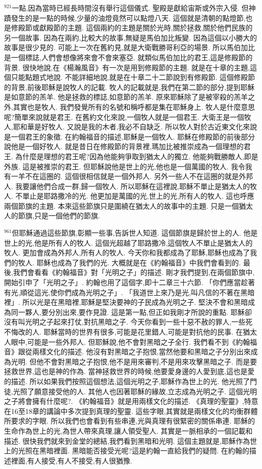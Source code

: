 \documentclass{book}
\begin{document}
$^{921}$一點,因為當時已經長時間沒有舉行這個儀式.
聖殿是獻給宙斯或外宗入侵.
但神蹟發生的是一點的時候,少量的油燈竟然可以點燈八天.
這個就是清朝的點燈節,也是修殿節或獻殿節的主題.
這個兩約的主題是關於光時,關於拯救,關於他們民族的另一個故事.
因為在兩約,比較大的故事,無疑是馬伯加比叛變.
因為這個以小勝大的故事是很少見的.
可能上一次在舊約見,就是大衛戰勝哥利亞的場景.
所以馬伯加比是一個標誌,人們會想像將來會不會來塞亞.
就類似馬伯加比的君王,這是修殿節的背景.
很快地說,在《楊瀚風音》有一次是用到修殿節的主題.
就是在十章的主題,這個只能點題式地說.
不能詳細地說,就是在十章二十二節說到有修殿節.
這個修殿節的背景,前後耶穌是說牧人的記載.
牧人的記載就是,我們在第二節的部分,提到耶穌是如意節的羔羊.
他是拯救的標誌,如意節的羔羊.
原來耶穌除了是被宰殺的羔羊之外,其實也是牧人.
我們發覺所有的名號和稱呼都是集在耶穌身上.
牧人是什麼意思呢?簡單來說就是君王.
在舊約文化來說,一個牧人就是一個君王.
大衛王是一個牧人,耶和華是好牧人.
又說是我的木者,我必不自缺乏.
所以牧人對於古近東文化來說是一個君王的象徵.
在約翰福音的描述,耶穌是一個牧人.
耶穌在修殿節的前後部分說他是一個好牧人.
就是昔日在修殿節的背景裡,瑪加比被推崇成為一個理想的君王.
為什麼是理想的君王呢?因為他能夠爭取到猶太人的獨立.
他能夠戰勝敵人,即是外族.
這是被推崇的君王.
但耶穌說他是世上的光,他也是一個萬國的牧人.
我令我有一羊不在這圈的.
這個很相信就是一個外邦人.
另外一些人不在這圈的就是外邦人.
我要讓他們合成一群,歸一個牧人.
所以耶穌在這裡說,耶穌不單止是猶太人的牧人.
不單止是耶路撒冷的光.
他更加是萬國的光,世上的光,所有人的牧人.
這也呼應兩個節旗的主題.
本來這些節旗只是圍繞在猶太人的故事中的主題.
只是一個猶太人的節旗,只是一個他們的節旗.

$^{961}$但耶穌通過這些節旗,彰顯一些事,告訴世人知道.
這個節旗是歸於世上的人.
他是世上的光,他是所有人的牧人.
這個光超越了耶路撒冷,這個牧人不單止是猶太人的牧人.
更加會成為外邦人,所有人的牧人.
今天你和我都成為了耶穌,耶穌也成為了我們的牧人.
耶穌也成為了我們的光.
大概就是在《約翰福音》中我們會看到的.
最後,我們會看看《約翰福音》對「光明之子」的描述.
剛才我們提到,在兩個節旗中,開始引申了「光明之子」.
約翰也用了這個字,即十二章三十六節.
「你們應當趁著有光,順從這光,使你們成為光明之子」.
「我道世上來乃是光,叫凡信的不著在黑暗裡」.
所以光是在黑暗裡,耶穌是堅決要神的子民成為光明之子.
堅決不會和黑暗成為同一夥人,要分別出來,要作見證.
這是第一點,但正如我剛才所說的重點.
耶穌卻沒有叫光明之子起來打仗,對抗黑暗之子.
今天你看到一些十惡不赦的罪人,一些死不悔改的人.
耶穌當時的世界有很多,可能是花里錯人,可能是對抗他的民事.
在猶太人眼中,可能是一些外邦人.
但耶穌說,他不會對黑暗之子全行.
我們看不到《約翰福音》跟從兩樣文化的描述.
他沒有對黑暗之子抱恨,當然他要和黑暗之子分別出來成為光明.
但他不會對黑暗之子抱恨,他不是用來審判,不是用來攻擊黑暗之子.
而是要拯救世界,這也是神的作為.
當神拯救世界的時候,他要愛身邊的人愛到底,這也是愛的描述.
所以如果我們按照這個想法,這個光明之子,耶穌作為世上的光.
他光照了門徒,光照了願意接受他的人.
其他人也因著耶穌的緣故,立志成為光明之子.
這個光明之子將會擁有什麼呢?.
《約翰福音》就是用兩樣文化的描述.
《真理的聖靈》,特意在16至18章的講論中多次提到真理的聖靈.
這些字眼,其實就是兩樣文化的均衡群體所要求的字眼.
所以我們也會看到有些串連,光與真理有很緊密的關係串連.
耶穌的生命作為世上的光,為世人帶來真理,讓人領受聖人.
其實是一脈相承的一個記載和描述.
很快我們就來到金堂的總結,我們看到黑暗和光明.
這個主題就是,耶穌作為世上的光照在黑暗裡面.
黑暗能否接受光呢?這是約翰一直給我們的疑問.
在約翰的描述裡面,有人接受,有人不接受,有人很猶豫.
\end{document}
